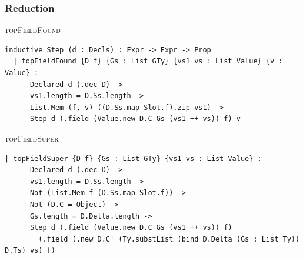 \subsubsection{Reduction}

\begin{cmp}{\textsc{topFieldFound}}
\begin{paperside}
\end{paperside}
\begin{leanside}
\begin{lstlisting}[style=leanside]
inductive Step (d : Decls) : Expr -> Expr -> Prop
  | topFieldFound {D f} {Gs : List GTy} {vs1 vs : List Value} {v : Value} :
      Declared d (.dec D) ->
      vs1.length = D.Ss.length ->
      List.Mem (f, v) ((D.Ss.map Slot.f).zip vs1) ->
      Step d (.field (Value.new D.C Gs (vs1 ++ vs)) f) v
\end{lstlisting}
\end{leanside}
\end{cmp}

\begin{cmp}{\textsc{topFieldSuper}}
\begin{paperside}
\end{paperside}
\begin{leanside}
\begin{lstlisting}[style=leanside]
  | topFieldSuper {D f} {Gs : List GTy} {vs1 vs : List Value} :
      Declared d (.dec D) ->
      vs1.length = D.Ss.length ->
      Not (List.Mem f (D.Ss.map Slot.f)) ->
      Not (D.C = Object) ->
      Gs.length = D.Delta.length ->
      Step d (.field (Value.new D.C Gs (vs1 ++ vs)) f)
        (.field (.new D.C' (Ty.substList (bind D.Delta (Gs : List Ty)) D.Ts) vs) f)
\end{lstlisting}
\end{leanside}
\nomapping
\end{cmp}

